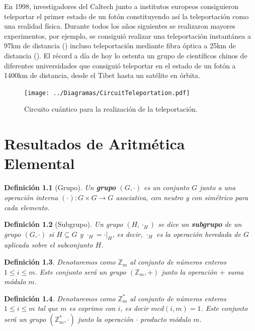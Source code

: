 \documentclass[11pt, spanish]{report}
\numberwithin{equation}{section}
\newtheorem{defin}{Definición}[section]
\numberwithin{defin}{section}
\begin{document}
\begin{appendices}
En 1998, investigadores del Caltech junto a institutos europeos consiguieron teleportar el primer estado de un fotón constituyendo así la teleportación como una realidad física. Durante todos los años siguientes se realizaron mayores experimentos, por ejemplo, se consiguió realizar una teleportación instantánea a 97km de distancia (\cite{2012Natur.488..185Y}) incluso teleportación mediante fibra óptica a 25km de distancia (\cite{2014NaPho...8..775B}). El récord a día de hoy lo ostenta un grupo de científicos chinos de diferentes universidades que consiguió teleportar en \cite{2017Natur.549...70R} el estado de un fotón a 1400km de distancia, desde el Tibet hasta un satélite en órbita.\\

\begin{figure}
\begin{center}
\texttt{[image: ../Diagramas/CircuitTeleportation.pdf]}
\end{center}
\caption{Circuito cuántico para la realización de la teleportación.}\label{teleportation}
\end{figure}

\chapter{Resultados de Aritmética Elemental}

\begin{defin}[Grupo]
Un \textbf{grupo} $(G,\cdot)$ es un conjunto $G$ junto a una operación interna $(\cdot):G\times G \rightarrow G$ asociativa, con neutro y con simétrico para cada elemento.
\end{defin}

\begin{defin}[Subgrupo] Un grupo $(H,\cdot_H)$ se dice un \textbf{subgrupo} de un grupo $(G,\cdot)$ si $H\subseteq G$ y $\cdot_H=\cdot|_H$, es decir, $\cdot_H$ es la operación heredada de $G$ aplicada sobre el subconjunto $H$.
\end{defin}

\begin{defin} 
Denotaremos como $\mathbb{Z}_m$ al conjunto de números enteros $1\leq i\leq m$.  Este conjunto será un grupo $(\mathbb{Z}_m, +)$ junto la operación $+$ suma módulo $m$.
\end{defin}

\begin{defin}  \label{apend:algebra}
Denotaremos como $\mathbb{Z}_m^*$ al conjunto de números enteros $1\leq i\leq m$ tal que $m$ es coprimo con $i$, es decir $mcd(i,m)=1$. Este conjunto será un grupo $(\mathbb{Z}_m^*, \cdot)$ junto la operación $\cdot$ producto módulo $m$.


\end{defin}
\end{appendices}
\end{document}
